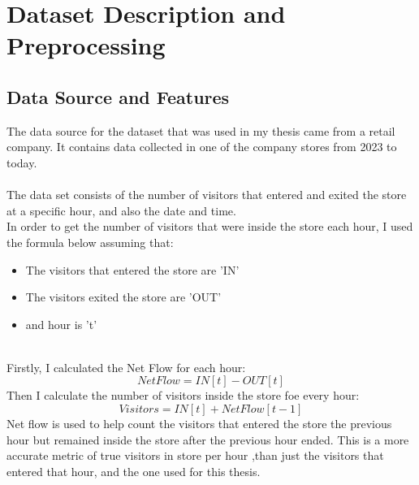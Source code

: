 \documentclass{article}
\begin{document}
\section{Dataset Description and Preprocessing}
\subsection{Data Source and Features}
The data source for the dataset that was used in my thesis came from a retail company. It contains data collected in one of the company stores from 2023 to today.\\
\\
The data set consists of the number of visitors that entered and exited the store at a specific hour, and also the date and time.\\
In order to get the number of visitors that were inside the store each hour, I used the formula below assuming that:
\begin{itemize}
    \item  The visitors that entered the store are 'IN'
\end{itemize}
\begin{itemize}
    \item The visitors exited the store are 'OUT'
\end{itemize}
\begin{itemize}
    \item and hour is 't'
\end{itemize}
\\
Firstly, I calculated the Net Flow for each hour:
\begin{equation}
NetFlow = IN[t] - OUT[t]
\end{equation}
Then I calculate the number of visitors inside the store foe every hour:
\begin{equation}
Visitors = IN[t] + NetFlow[t-1]
\end{equation}
Net flow is used to help count the visitors that entered the store the previous hour but remained inside the store after the previous hour ended. This is a more accurate metric of true visitors in store per hour ,than just the visitors that entered that hour, and the one used for this thesis.
\end{document}
